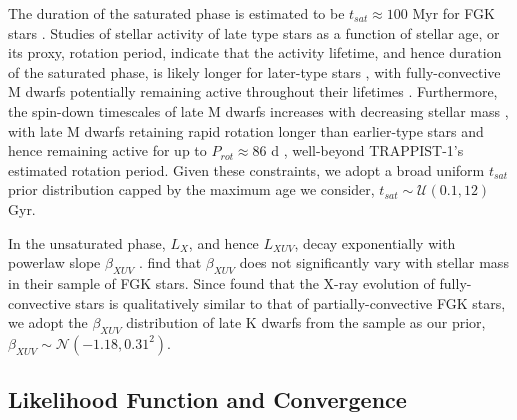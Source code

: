 \documentclass[twocolumn]{aastex62}
\def\gsim{~\rlap{$>$}{\lower 1.0ex\hbox{$\sim$}}}
\begin{document}
The duration of the saturated phase is estimated to be $t_{sat} \approx 100$ Myr for FGK stars \citep{Jackson2012}. Studies of stellar activity of late type stars as a function of stellar age, or its proxy, rotation period, indicate that the activity lifetime, and hence duration of the saturated phase, is likely longer for later-type stars \citep{Shkolnik2014,Wright2011,West2015}, with fully-convective M dwarfs potentially remaining active throughout their lifetimes \citep[$t_{sat} \gsim 7$ Gyr,][]{West2008,Schneider2018}. Furthermore, the spin-down timescales of late M dwarfs increases with decreasing stellar mass \citep{Delfosse1998}, with late M dwarfs retaining rapid rotation longer than earlier-type stars and hence remaining active for up to $P_{rot} \approx 86$ d \citep{West2015}, well-beyond TRAPPIST-1's estimated rotation period. Given these constraints, we adopt a broad uniform $t_{sat}$ prior distribution capped by the maximum age we consider, $t_{sat} \sim \mathcal{U}(0.1, 12)$ Gyr. 

In the unsaturated phase, $L_{X}$, and hence $L_{XUV}$, decay exponentially with powerlaw slope $\beta_{XUV}$ \citep{Ribas2005}. \citet{Jackson2012} find that $\beta_{XUV}$ does not significantly vary with stellar mass in their sample of FGK stars. Since \citet{Wright2016} found that the X-ray evolution of fully-convective stars is qualitatively similar to that of partially-convective FGK stars, we adopt the $\beta_{XUV}$ distribution of late K dwarfs from the \citet{Jackson2012} sample as our prior, $\beta_{XUV} \sim \mathcal{N}(-1.18, 0.31^2)$.


\subsection{Likelihood Function and Convergence} \label{sec:mcmc:like}
\end{document}
